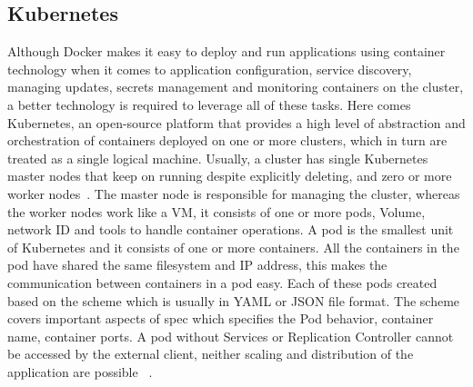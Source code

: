 \subsection{Kubernetes}
Although Docker makes it easy to deploy and run applications using
container technology when it comes to application configuration,
service discovery, managing updates, secrets management and monitoring
containers on the cluster, a better technology is required to leverage
all of these tasks. Here comes Kubernetes, an open-source platform
that provides a high level of abstraction and orchestration of
containers deployed on one or more clusters, which in turn are treated
as a single logical machine. Usually, a cluster has single Kubernetes
master nodes that keep on running despite explicitly deleting, and
zero or more worker nodes~\cite{hid-sp18-602-kubernetes}. The
master node is responsible for managing the cluster, whereas the
worker nodes work like a VM, it consists of one or more pods, Volume,
network ID and tools to handle container operations. A pod is the
smallest unit of Kubernetes and it consists of one or more
containers. All the containers in the pod have shared the same
filesystem and IP address, this makes the communication between
containers in a pod easy. Each of these pods created based on the
scheme which is usually in YAML or JSON file format. The scheme covers
important aspects of spec which specifies the Pod behavior, container
name, container ports. A pod without Services or Replication
Controller cannot be accessed by the external client, neither scaling
and distribution of the application are possible
~\cite{hid-sp18-602-pods}.

